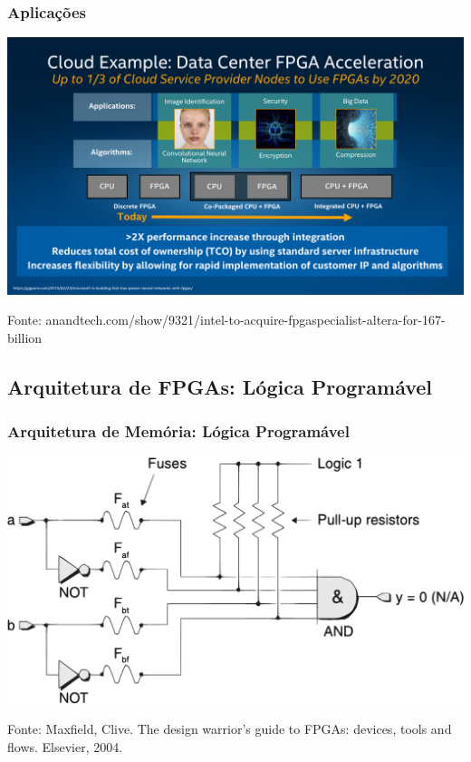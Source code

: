 \documentclass[10pt, compress]{beamer}
\begin{document}
\begin{frame}
    \frametitle{Aplicações}
    \begin{center}
        \includegraphics[width=\textwidth]{fpga2020}
    \end{center}

    \vfill

    \begin{center}
        \scriptsize{Fonte: anandtech.com/show/9321/intel-to-acquire-fpgaspecialist-altera-for-167-billion}
    \end{center}
\end{frame}

\subsection{Arquitetura de FPGAs: Lógica Programável}

\begin{frame}
    \frametitle{Arquitetura de Memória: Lógica Programável}
    \begin{center}
        \includegraphics[width=.75\textwidth]{fusible-link}
    \end{center}

    \vfill

    \begin{center}
        \scriptsize{Fonte: Maxfield, Clive. The design warrior's guide to FPGAs: devices, tools and flows. Elsevier, 2004.}
    \end{center}
\end{frame}
\end{document}

